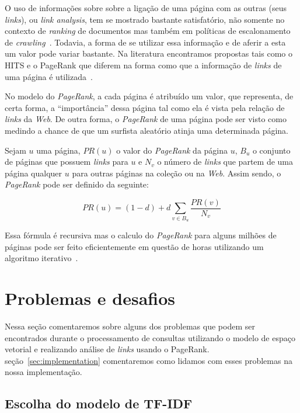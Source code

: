\documentclass[10pt,twocolumn]{article}
\begin{document}
O uso de informações sobre sobre a ligação de uma página com as outras
(seus \emph{links}), ou \emph{link analysis}, tem se mostrado bastante
satisfatório, não somente no contexto de \emph{ranking} de documentos
mas também em políticas de escalonamento de
\emph{crawling}~\cite{baezayates2005crawling}. Todavia, a forma de se
utilizar essa informação e de aferir a esta um valor pode variar
bastante. Na literatura encontramos propostas tais como o HITS e o
PageRank que diferem na forma como que a informação de \emph{links} de
uma página é utilizada~\cite{page98pagerank}.

No modelo do \emph{PageRank}, a cada página é atribuído um valor, que
representa, de certa forma, a ``importância'' dessa página tal como ela
é vista pela relação de \emph{links} da \emph{Web}. De outra forma, o
\emph{PageRank} de uma página pode ser visto como medindo a chance de
que um surfista aleatório atinja uma determinada página.

Sejam \(u\) uma página, \(PR(u)\) o valor do \emph{PageRank} da página
\(u\), \(B_u\) o conjunto de páginas que possuem
\emph{links} para \(u\) e \(N_v\) o número de \emph{links} que
partem de uma página qualquer \(u\) para outras páginas na coleção ou na
\emph{Web}. Assim sendo, o \emph{PageRank} pode ser definido da
seguinte:

\begin{equation}
 PR(u) = (1-d) + d\sum_{v \in B_u}\frac{PR(v)}{N_v}
\label{eq:pagerank}
\end{equation}

Essa fórmula é recursiva mas o calculo do \emph{PageRank} para alguns
milhões de páginas pode ser feito eficientemente em questão de horas
utilizando um algoritmo iterativo~\cite{brin1998google}.




\section{Problemas e desafios}

Nessa seção comentaremos sobre alguns dos problemas que podem ser
encontrados durante o processamento de consultas utilizando o modelo de
espaço vetorial e realizando análise de \emph{links} usando o PageRank.
seção~\ref{sec:implementation} comentaremos como lidamos com esses
problemas na nossa implementação.

\subsection{Escolha do modelo de TF-IDF}
\end{document}
